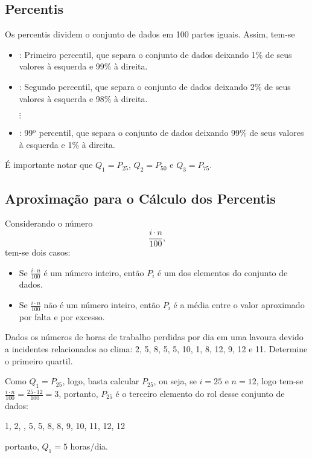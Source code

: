 \documentclass[11pt,fleqn]{book}
\numberwithin{mpicture}{chapter}
\numberwithin{mtable}{chapter}
\numberwithin{mframe}{chapter}
\begin{document}
\subsection{Percentis}

Os percentis dividem o conjunto de dados em 100 partes iguais. Assim, tem-se
\begin{itemize}
	\item {}: Primeiro percentil, que separa o conjunto de dados deixando 1\% de seus valores à esquerda e 99\% à direita.
	\item {}: Segundo percentil, que separa o conjunto de dados deixando 2\% de seus valores à esquerda e 98\% à direita.
	\begin{center}
		$\vdots$
	\end{center}
	\item {}: 99$^{\text{o}}$ percentil, que separa o conjunto de dados deixando 99\% de seus valores à esquerda e 1\% à direita.
\end{itemize}

\begin{remark}
	É importante notar que $Q_1=P_{25}$, $Q_2=P_{50}$ e $Q_3=P_{75}$.
\end{remark}

\subsection{Aproximação para o Cálculo dos Percentis}

Considerando o número
\[
\frac{i\cdot n}{100}\text{,}
\]
tem-se dois casos:
\begin{itemize}
	\item Se $\frac{i\cdot n}{100}$ é um número inteiro, então $P_i$ é um dos elementos do conjunto de dados.
	
	\item Se $\frac{i\cdot n}{100}$ não é um número inteiro, então $P_i$ é a média entre o valor aproximado por falta e por excesso.
\end{itemize}

\begin{example}
	Dados os números de horas de trabalho perdidas por dia em uma lavoura devido a incidentes relacionados ao clima: 2, 5, 8, 5, 5, 10, 1, 8, 12, 9, 12 e 11. Determine o primeiro quartil.
	
	Como $Q_1=P_{25}$, logo, basta calcular $P_{25}$, ou seja, se $i=25$ e $n=12$, logo tem-se $\frac{i\cdot n}{100}=\frac{25\cdot 12}{100}=3$, portanto, $P_{25}$ é o terceiro elemento do rol desse conjunto de dados:
	\begin{center}
		1, 2, , 5, 5, 8, 8, 9, 10, 11, 12, 12\text{,}
	\end{center}
	portanto, $Q_1=5$ horas/dia.
\end{example}
\end{document}
